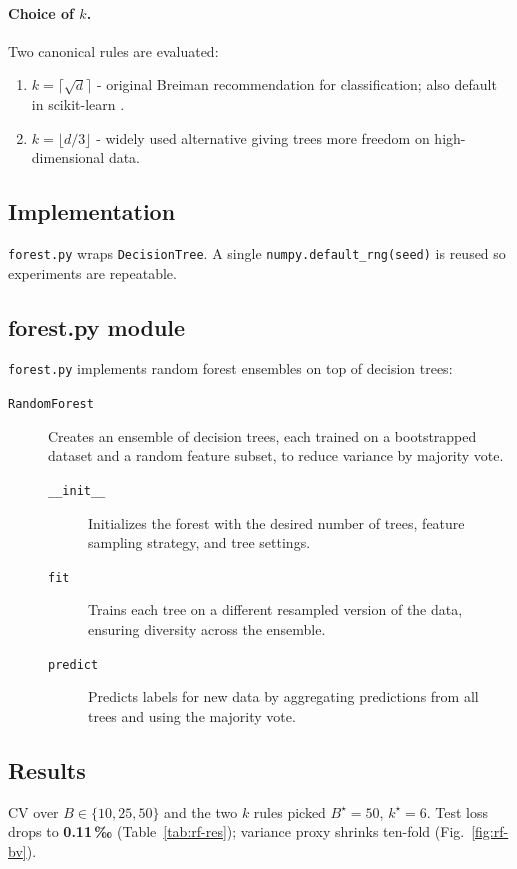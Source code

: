 \documentclass[12pt]{report}
\begin{document}
\paragraph{Choice of $k$.}
Two canonical rules are evaluated:

\begin{enumerate}
  \item $k=\lceil\sqrt d\rceil$ - original Breiman recommendation for
        classification; also default in scikit-learn
        \citep{pedregosa2011scikit}.

  \item $k=\lfloor d/3\rfloor$ - widely used alternative giving trees more
        freedom on high-dimensional data.
\end{enumerate}

\subsection{Implementation}
\texttt{forest.py} wraps \texttt{DecisionTree}.  A single
\texttt{numpy.default\_rng(seed)} is reused so experiments are repeatable.

\subsection{forest.py module}
\texttt{forest.py} implements random forest ensembles on top of decision trees:

\begin{description}
  \item[\texttt{RandomForest}]
        Creates an ensemble of decision trees, each trained on a bootstrapped
        dataset and a random feature subset, to reduce variance by majority vote.
    \begin{description}
      \item[\texttt{\_\_init\_\_}]
            Initializes the forest with the desired number of trees, feature sampling
            strategy, and tree settings.
      \item[\texttt{fit}]
            Trains each tree on a different resampled version of the data, ensuring
            diversity across the ensemble.
      \item[\texttt{predict}]
            Predicts labels for new data by aggregating predictions from all trees and
            using the majority vote.
    \end{description}
\end{description}

\subsection{Results}
CV over $B\!\in\!\{10,25,50\}$ and the two $k$ rules picked $B^\star=50$,
$k^\star=6$.  Test loss drops to \textbf{0.11\,‰} (Table~\ref{tab:rf-res});
variance proxy shrinks ten-fold (Fig.~\ref{fig:rf-bv}).
\end{document}
